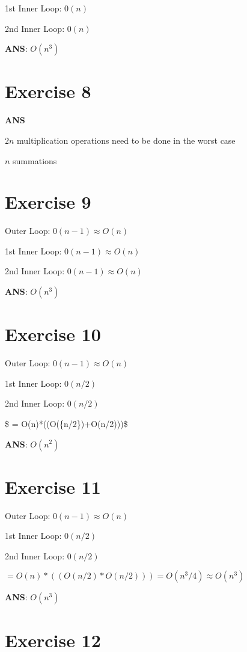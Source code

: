 \documentclass[
]{article}
\begin{document}
1st Inner Loop: \(0({n})\)

2nd Inner Loop: \(0({n})\)

\textbf{ANS}: \(O(n^3)\)

\hypertarget{exercise-8}{%
\section{Exercise 8}\label{exercise-8}}

\textbf{ANS}

\(2n\) multiplication operations need to be done in the worst case

\(n\) summations

\hypertarget{exercise-9}{%
\section{Exercise 9}\label{exercise-9}}

Outer Loop: \(0({n-1}) \approx O(n)\)

1st Inner Loop: \(0({n-1}) \approx O(n)\)

2nd Inner Loop: \(0({n-1}) \approx O(n)\)

\textbf{ANS}: \(O(n^3)\)

\hypertarget{exercise-10}{%
\section{Exercise 10}\label{exercise-10}}

Outer Loop: \(0({n-1}) \approx O(n)\)

1st Inner Loop: \(0({n/2})\)

2nd Inner Loop: \(0({n/2})\)

\$ = O(n)*((O(\{n/2\})+O(n/2)))\$

\textbf{ANS}: \(O(n^2)\)

\hypertarget{exercise-11}{%
\section{Exercise 11}\label{exercise-11}}

Outer Loop: \(0({n-1}) \approx O(n)\)

1st Inner Loop: \(0({n/2})\)

2nd Inner Loop: \(0({n/2})\)

\(= O(n)*((O({n/2})*O(n/2))) = O(n^3/4) \approx O(n^3)\)

\textbf{ANS}: \(O(n^3)\)

\hypertarget{exercise-12}{%
\section{Exercise 12}\label{exercise-12}}
\end{document}
